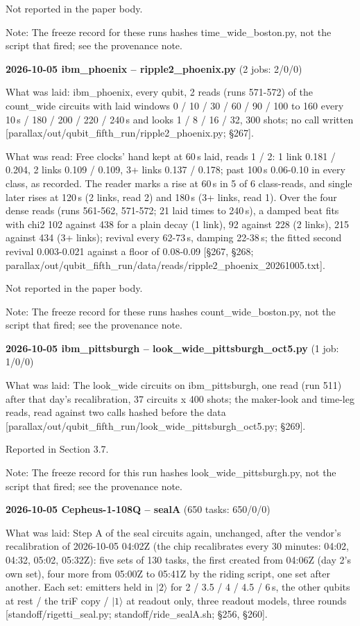 \documentclass[11pt]{article}
\begin{document}
Not reported in the paper body.

Note: The freeze record for these runs hashes time\_wide\_boston.py, not the script that fired; see the provenance note.

\textbf{2026-10-05 ibm\_phoenix -- ripple2\_phoenix.py} (2 jobs: 2/0/0)

What was laid: ibm\_phoenix, every qubit, 2 reads (runs 571-572) of the count\_wide circuits with laid windows 0 / 10 / 30 / 60 / 90 / 100 to 160 every 10\,\textmu s / 180 / 200 / 220 / 240\,\textmu s and looks 1 / 8 / 16 / 32, 300 shots; no call written {[}parallax/out/qubit\_fifth\_run/ripple2\_phoenix.py; \S{}267{]}.

What was read: Free clocks' hand kept at 60\,\textmu s laid, reads 1 / 2: 1 link 0.181 / 0.204, 2 links 0.109 / 0.109, 3+ links 0.137 / 0.178; past 100\,\textmu s 0.06-0.10 in every class, as recorded. The reader marks a rise at 60\,\textmu s in 5 of 6 class-reads, and single later rises at 120\,\textmu s (2 links, read 2) and 180\,\textmu s (3+ links, read 1). Over the four dense reads (runs 561-562, 571-572; 21 laid times to 240\,\textmu s), a damped beat fits with chi2 102 against 438 for a plain decay (1 link), 92 against 228 (2 links), 215 against 434 (3+ links); revival every 62-73\,\textmu s, damping 22-38\,\textmu s; the fitted second revival 0.003-0.021 against a floor of 0.08-0.09 {[}\S{}267, \S{}268; parallax/out/qubit\_fifth\_run/data/reads/ripple2\_phoenix\_20261005.txt{]}.

Not reported in the paper body.

Note: The freeze record for these runs hashes count\_wide\_boston.py, not the script that fired; see the provenance note.

\textbf{2026-10-05 ibm\_pittsburgh -- look\_wide\_pittsburgh\_oct5.py} (1 job: 1/0/0)

What was laid: The look\_wide circuits on ibm\_pittsburgh, one read (run 511) after that day's recalibration, 37 circuits x 400 shots; the maker-look and time-leg reads, read against two calls hashed before the data {[}parallax/out/qubit\_fifth\_run/look\_wide\_pittsburgh\_oct5.py; \S{}269{]}.

Reported in Section 3.7.

Note: The freeze record for this run hashes look\_wide\_pittsburgh.py, not the script that fired; see the provenance note.

\textbf{2026-10-05 Cepheus-1-108Q -- sealA} (650 tasks: 650/0/0)

What was laid: Step A of the seal circuits again, unchanged, after the vendor's recalibration of 2026-10-05 04:02Z (the chip recalibrates every 30 minutes: 04:02, 04:32, 05:02, 05:32Z): five sets of 130 tasks, the first created from 04:06Z (day 2's own set), four more from 05:00Z to 05:41Z by the riding script, one set after another. Each set: emitters held in \(|2\rangle\) for 2 / 3.5 / 4 / 4.5 / 6\,\textmu s, the other qubits at rest / the triF copy / \(|1\rangle\) at readout only, three readout models, three rounds {[}standoff/rigetti\_seal.py; standoff/ride\_sealA.sh; \S{}256, \S{}260{]}.
\end{document}
